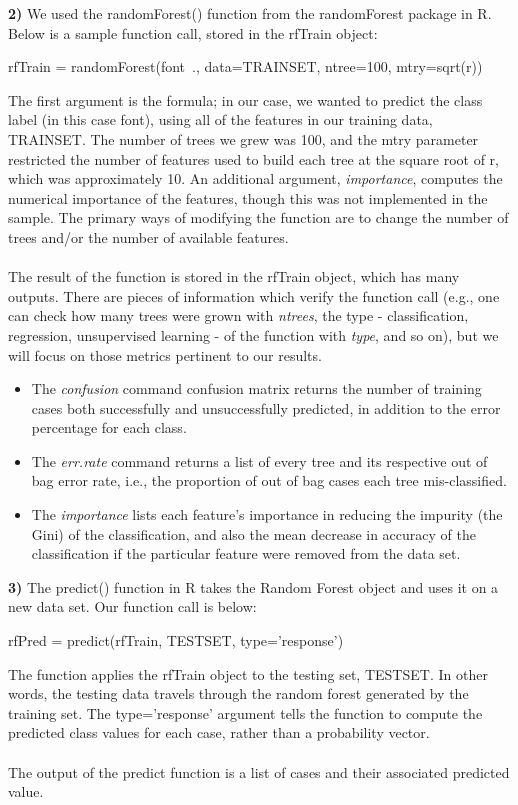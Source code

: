\documentclass{homework}
\begin{document}
\textbf{2)} We used the randomForest() function from the randomForest package in R. Below is a sample function call, stored in the rfTrain object:
\begin{rc}
rfTrain = randomForest(font~., data=TRAINSET, ntree=100, mtry=sqrt(r))
\end{rc}
The first argument is the formula; in our case, we wanted to predict the class label (in this case font), using all of the features in our training data, TRAINSET. The number of trees we grew was 100, and the mtry parameter restricted the number of features used to build each tree at the square root of r, which was approximately 10. An additional argument, \textit{importance}, computes the numerical importance of the features, though this was not implemented in the sample. The primary ways of modifying the function are to change the number of trees and/or the number of available features.\\\\
The result of the function is stored in the rfTrain object, which has many outputs. There are pieces of information which verify the function call (e.g., one can check how many trees were grown with \textit{ntrees}, the type - classification, regression, unsupervised learning - of the function with \textit{type}, and so on), but we will focus on those metrics pertinent to our results. \begin{itemize}
    \item The \textit{confusion} command confusion matrix returns the number of training cases both successfully and unsuccessfully predicted, in addition to the error percentage for each class.
    \item The \textit{err.rate} command returns a list of every tree and its respective out of bag error rate, i.e., the proportion of out of bag cases each tree mis-classified.
    \item The \textit{importance} lists each feature's importance in reducing the impurity (the Gini) of the classification, and also the mean decrease in accuracy of the classification if the particular feature were removed from the data set.
\end{itemize}

\textbf{3)} The predict() function in R takes the Random Forest object and uses it on a new data set. Our function call is below:
\begin{rc}
rfPred = predict(rfTrain, TESTSET, type='response')
\end{rc}
The function applies the rfTrain object to the testing set, TESTSET. In other words, the testing data travels through the random forest generated by the training set. The type='response' argument tells the function to compute the predicted class values for each case, rather than a probability vector.\\\\
The output of the predict function is a list of cases and their associated predicted value.
\end{document}
